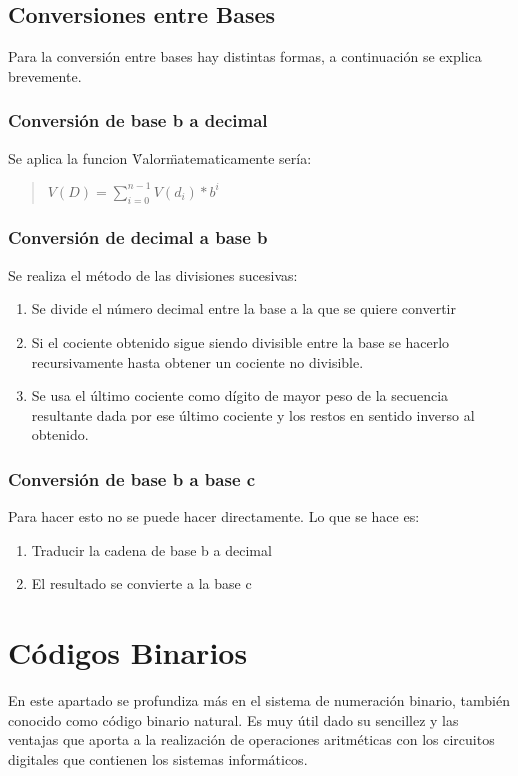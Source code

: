\documentclass{article}
\begin{document}
\subsection{Conversiones entre Bases}
Para la conversión  entre bases hay distintas formas, a continuación se explica
brevemente.
\subsubsection{Conversión de base b a decimal}
Se aplica la funcion \"Valor\" matematicamente sería:
\begin{quote}
    $V(D) = \sum_{i = 0}^{n - 1} V(d_i)*b^i$
\end{quote}
\subsubsection{Conversión de decimal a base b}
Se realiza el método de las divisiones sucesivas:
 \begin{enumerate}
    \item Se divide el número decimal entre la base a la que se quiere convertir
    \item Si el cociente obtenido sigue siendo divisible entre la base se hacerlo
    recursivamente hasta obtener un cociente no divisible.
    \item Se usa el último cociente como dígito de mayor peso de la secuencia 
    resultante dada por ese último cociente y los restos en sentido inverso
    al obtenido.
 \end{enumerate}
\subsubsection{Conversión de base b a base c}
Para hacer esto no se puede hacer directamente. Lo que se hace es:
\begin{enumerate}
    \item Traducir la cadena de base b a decimal
    \item El resultado se convierte a la base c
\end{enumerate}

\section{Códigos Binarios}
En este apartado se profundiza más en el sistema de numeración binario, también
conocido como código binario natural. Es muy útil dado su sencillez y las 
ventajas que aporta a la realización de operaciones aritméticas con los
circuitos digitales que contienen los sistemas informáticos.\\\\
\end{document}
